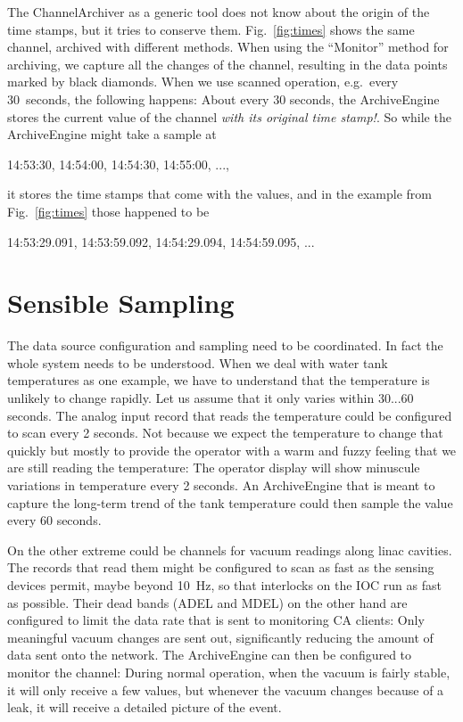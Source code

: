 The ChannelArchiver as a generic tool does not know about the origin
of the time stamps, but it tries to conserve them.
Fig.~\ref{fig:times} shows the same channel, archived with different methods.
When using the ``Monitor'' method for archiving, we capture all the
changes of the channel, resulting in the data points marked by black
diamonds.
When we use scanned operation, e.g.\ every 30~seconds, the following
happens: About every 30 seconds, the ArchiveEngine stores the current
value of the channel \emph{with its original time stamp!}.
So while the ArchiveEngine might take a sample at
\begin{center}
14:53:30, 14:54:00, 14:54:30, 14:55:00, ...,
\end{center}
it stores the time stamps that come with the values, and in the
example from Fig.~\ref{fig:times} those happened to be
\begin{center}
14:53:29.091,  14:53:59.092, 14:54:29.094,  14:54:59.095, ...
\end{center}

\section{Sensible Sampling}
The data source configuration and sampling need to be coordinated.  In
fact the whole system needs to be understood. When we deal with water
tank temperatures as one example, we have to understand that the
temperature is unlikely to change rapidly. Let us assume that it only
varies within 30...60 seconds. The analog input record that reads the
temperature could be configured to scan every 2 seconds. Not because
we expect the temperature to change that quickly but mostly to provide
the operator with a warm and fuzzy feeling that we are still reading
the temperature: The operator display will show minuscule variations
in temperature every 2 seconds.  An ArchiveEngine that is meant to
capture the long-term trend of the tank temperature could then sample
the value every 60 seconds.

On the other extreme could be channels for vacuum readings along linac
cavities. The records that read them might be configured to scan as
fast as the sensing devices permit, maybe beyond 10~Hz, so that
interlocks on the IOC run as fast as possible. Their dead bands (ADEL
and MDEL) on the other hand are configured to limit the data rate that
is sent to monitoring CA clients: Only meaningful vacuum changes are
sent out, significantly reducing the amount of data sent onto the
network.  The ArchiveEngine can then be configured to monitor the
channel: During normal operation, when the vacuum is fairly stable, it
will only receive a few values, but whenever the vacuum changes
because of a leak, it will receive a detailed picture of the event.

